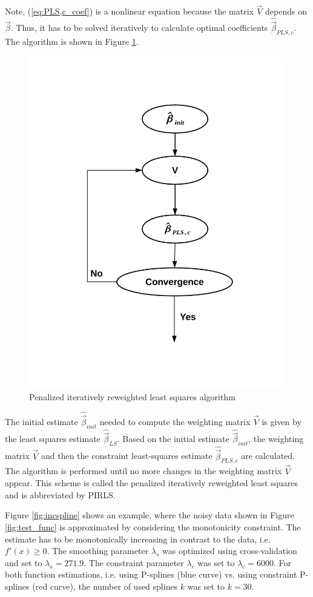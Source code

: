 Note, (\ref{eq:PLS,c_coef}) is a nonlinear equation because the matrix $\vec{V}$ depends on $\vec{\beta}$. Thus, it has to be solved iteratively to calculate optimal coefficients $\hat{\vec{\beta}}_{PLS,c}$. The algorithm is shown in Figure \ref{fig:pirls}. 

\begin{figure}[H]
	\centering
	\includegraphics[width=0.6\linewidth]{thesisplots/algorithm.pdf}
	\caption{Penalized iteratively reweighted least squares algorithm}
	\label{fig:pirls}
\end{figure}


The initial estimate $\hat{\vec{\beta}}_{init}$ needed to compute the weighting matrix $\vec{V}$ is given by the least squares estimate $\hat{\vec{\beta}}_{LS}$. Based on the initial estimate $\hat{\vec{\beta}}_{init}$, the weighting matrix $\vec{V}$ and then the constraint least-squares estimate $\hat{\vec{\beta}}_{PLS,c}$ are calculated. The algorithm is performed until no more changes in the weighting matrix $\vec{V}$ appear. This scheme is called the penalized iteratively reweighted least squares and is abbreviated by PIRLS. \cite{hofner2011monotonicity}


Figure \ref{fig:incspline} shows an example, where the noisy data shown in Figure \ref{fig:test_func} is approximated by considering the monotonicity constraint. The estimate has to be monotonically increasing in contrast to the data, i.e. $f'(x) \ge 0$.  The smoothing parameter $\lambda_s$ was optimized using cross-validation and set to $\lambda_s=271.9$. The constraint parameter $\lambda_c$ was set to $\lambda_c = 6000$. For both function estimations, i.e. using P-splines (blue curve) vs. using constraint P-splines (red curve), the number of used splines $k$ was set to $k=30$. 	

